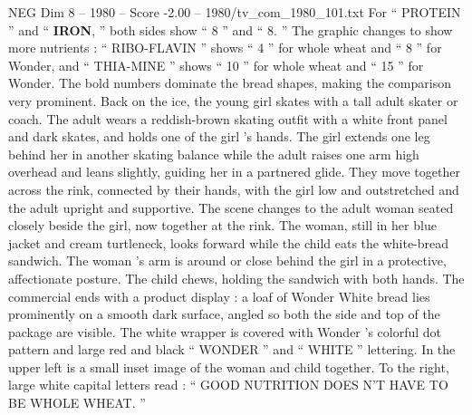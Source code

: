 \begin{textsample}{NEG Dim 8 – 1980 – Score -2.00 – 1980/tv\_com\_1980\_101.txt}
For “ PROTEIN ” and “ \textbf{IRON}, ” both sides show “ 8 ” and “ 8. ” The graphic changes to show more nutrients : “ RIBO-FLAVIN ” shows “ 4 ” for whole wheat and “ 8 ” for Wonder, and “ THIA-MINE ” shows “ 10 ” for whole wheat and “ 15 ” for Wonder.
The bold numbers dominate the bread shapes, making the comparison very prominent.
Back on the ice, the young girl skates with a tall adult skater or coach.
The adult wears a reddish-brown skating outfit with a white front panel and dark skates, and holds one of the girl ’s hands.
The girl extends one leg behind her in another skating balance while the adult raises one arm high overhead and leans slightly, guiding her in a partnered glide.
They move together across the rink, connected by their hands, with the girl low and outstretched and the adult upright and supportive.
The scene changes to the adult woman seated closely beside the girl, now together at the rink.
The woman, still in her blue jacket and cream turtleneck, looks forward while the child eats the white-bread sandwich.
The woman ’s arm is around or close behind the girl in a protective, affectionate posture.
The child chews, holding the sandwich with both hands.
The commercial ends with a product display : a loaf of Wonder White bread lies prominently on a smooth dark surface, angled so both the side and top of the package are visible.
The white wrapper is covered with Wonder ’s colorful dot pattern and large red and black “ WONDER ” and “ WHITE ” lettering.
In the upper left is a small inset image of the woman and child together.
To the right, large white capital letters read : “ GOOD NUTRITION DOES N’T HAVE TO BE WHOLE WHEAT. ”

\end{textsample}
